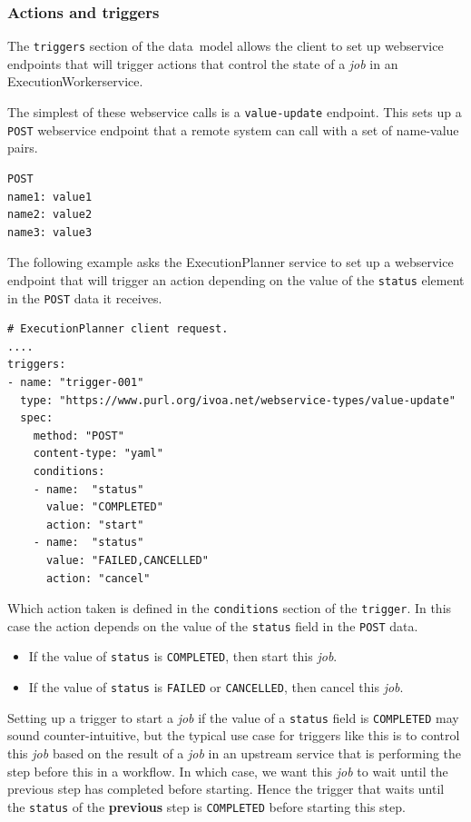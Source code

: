 \documentclass[11pt,a4paper]{ivoa}
\newcommand{\datamodel} {data~model}
\newcommand{\webservice} {webservice}
\newcommand{\execplanner} {ExecutionPlanner}
\newcommand{\execworker} {ExecutionWorker}
\newcommand{\codeword}[1] {\texttt{#1}}
\newcommand{\job} {\textit{job}}
\begin{document}
\subsubsection{Actions and triggers}
\label{triggers}

The \codeword{triggers} section of the \datamodel{} allows the client to
set up \webservice{} endpoints that will trigger actions that control the
state of a \job{} in an \execworker service.

The simplest of these \webservice{} calls is a \codeword{value-update} endpoint.
This sets up a \codeword{POST} \webservice{} endpoint that a remote system can
call with a set of name-value pairs.

\begin{lstlisting}[]
POST
name1: value1
name2: value2
name3: value3
\end{lstlisting}

The following example asks the \execplanner{} service to set up a \webservice{} endpoint
that will trigger an action depending on the value of the \codeword{status}
element in the \codeword{POST} data it receives.

\begin{lstlisting}[]
# ExecutionPlanner client request.
....
triggers:
- name: "trigger-001"
  type: "https://www.purl.org/ivoa.net/webservice-types/value-update"
  spec:
    method: "POST"
    content-type: "yaml"
    conditions:
    - name:  "status"
      value: "COMPLETED"
      action: "start"
    - name:  "status"
      value: "FAILED,CANCELLED"
      action: "cancel"
\end{lstlisting}

Which action taken is defined in the \codeword{conditions} section of the \codeword{trigger}.
In this case the action depends on the value of the \codeword{status} field in the \codeword{POST} data.
\begin{itemize}
    \item If the value of \codeword{status} is \codeword{COMPLETED}, then start this \job{}.
    \item If the value of \codeword{status} is \codeword{FAILED} or \codeword{CANCELLED}, then cancel this \job{}.
\end{itemize}

Setting up a trigger to start a \job{} if the value of a \codeword{status} field is \codeword{COMPLETED}
may sound counter-intuitive, but the typical use case for triggers like this is to
control this \job{} based on the result of a \job{} in an upstream service that is performing the
step before this in a workflow.
In which case, we want this \job{} to wait until the previous step has completed before starting.
Hence the trigger that waits until the \codeword{status} of the \textbf{previous} step is
\codeword{COMPLETED} before starting this step.
\end{document}
